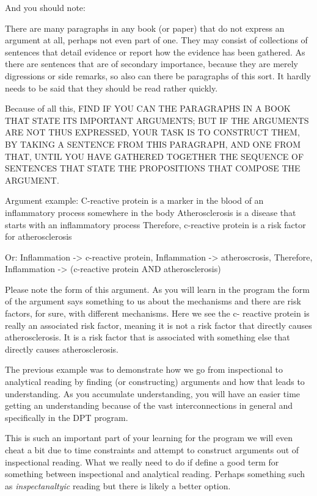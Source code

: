 And you should note: 
\begin{displayquote}
There are many paragraphs in any book (or paper) that do not express an argument at all, perhaps not even part of one. They may consist of collections of sentences that detail evidence or report how the evidence has been gathered. As there are sentences that are of secondary importance, because they are merely digressions or side remarks, so also can there be paragraphs of this sort. It hardly needs to be said that they should be read rather quickly. 

Because of all this, FIND IF YOU CAN THE PARAGRAPHS IN A BOOK THAT STATE ITS IMPORTANT ARGUMENTS; BUT IF THE ARGUMENTS ARE NOT THUS EXPRESSED, YOUR TASK IS TO CONSTRUCT THEM, BY TAKING A SENTENCE FROM THIS PARAGRAPH, AND ONE FROM THAT, UNTIL YOU HAVE GATHERED TOGETHER THE SEQUENCE OF SENTENCES THAT STATE THE PROPOSITIONS THAT COMPOSE THE ARGUMENT.
\end{displayquote}

Argument example:
C-reactive protein is a marker in the blood of an inflammatory process somewhere in the body
Atherosclerosis is a disease that starts with an inflammatory process
Therefore, c-reactive protein is a risk factor for atherosclerosis

Or:
Inflammation -> c-reactive protein,
Inflammation -> atheroscrosis,
Therefore, Inflammation -> (c-reactive protein AND atherosclerosis)

Please note the form of this argument. As you will learn in the program the form of the argument says something to us about the mechanisms and there are risk factors, for sure, with different mechanisms. Here we see the c- reactive protein is really an associated risk factor, meaning it is not a risk factor that directly causes atherosclerosis. It is a risk factor that is associated with something else that directly causes atherosclerosis.

The previous example was to demonstrate how we go from inspectional to analytical reading by finding (or constructing) arguments and how that leads to understanding. As you accumulate understanding, you will have an easier time getting an understanding because of the vast interconnections in general and specifically in the DPT program. 

This is such an important part of your learning for the program we will even cheat a bit due to time constraints and attempt to construct arguments out of inspectional reading. What we really need to do if define a good term for something between inspectional and analytical reading. Perhaps something such as \textit{inspectanaltyic} reading but there is likely a better option.


